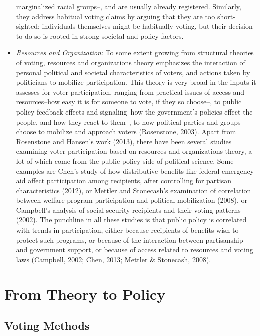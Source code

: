 \documentclass[12pt,twoside]{reedthesis}
\begin{document}
\begin{itemize}
    marginalized racial groups--, and are usually already registered.
    Similarly, they address habitual voting claims by arguing that they
    are too short-sighted; individuals themselves might be habitually
    voting, but their decision to do so is rooted in strong societal and
    policy factors.
  \item
    \emph{Resources and Organization}: To some extent growing from
    structural theories of voting, resources and organizations theory
    emphasizes the interaction of personal political and societal
    characteristics of voters, and actions taken by politicians to
    mobilize participation. This theory is very broad in the inputs it
    assesses for voter participation, ranging from practical issues of
    access and resources--how easy it is for someone to vote, if they so
    choose--, to public policy feedback effects and signaling--how the
    government's policies effect the people, and how they react to them--,
    to how political parties and groups choose to mobilize and approach
    voters (Rosenstone, 2003). Apart from Rosenstone and Hansen's work
    (2013), there have been several studies examining voter participation
    based on resources and organizations theory, a lot of which come from
    the public policy side of political science. Some examples are Chen's
    study of how distributive benefits like federal emergency aid affect
    participation among recipients, after controlling for partisan
    characteristics (2012), or Mettler and Stonecash's examination of
    correlation between welfare program participation and political
    mobilization (2008), or Campbell's analysis of social security
    recipients and their voting patterns (2002). The punchline in all
    these studies is that public policy is correlated with trends in
    participation, either because recipients of benefits wish to protect
    such programs, or because of the interaction between partisanship and
    government support, or because of access related to resources and
    voting laws (Campbell, 2002; Chen, 2013; Mettler \& Stonecash, 2008).
  \end{itemize}
  
  \section{From Theory to Policy}\label{from-theory-to-policy}
  
  \subsection{Voting Methods}\label{voting-methods}
  
\end{document}
